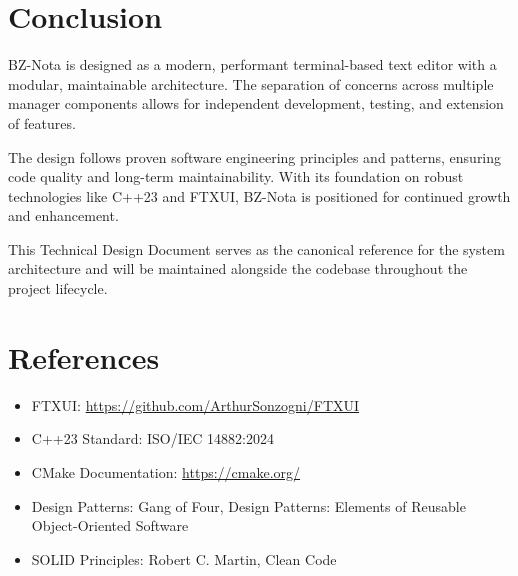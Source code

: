 \documentclass[12pt,a4paper,oneside,openany]{report}
\begin{document}
\chapter*{Conclusion}

BZ-Nota is designed as a modern, performant terminal-based text editor with a modular, maintainable architecture. The separation of concerns across multiple manager components allows for independent development, testing, and extension of features.

The design follows proven software engineering principles and patterns, ensuring code quality and long-term maintainability. With its foundation on robust technologies like C++23 and FTXUI, BZ-Nota is positioned for continued growth and enhancement.

This Technical Design Document serves as the canonical reference for the system architecture and will be maintained alongside the codebase throughout the project lifecycle.

\chapter*{References}

\begin{itemize}
	\item FTXUI: \url{https://github.com/ArthurSonzogni/FTXUI}
	\item C++23 Standard: ISO/IEC 14882:2024
	\item CMake Documentation: \url{https://cmake.org/}
	\item Design Patterns: Gang of Four, Design Patterns: Elements of Reusable Object-Oriented Software
	\item SOLID Principles: Robert C. Martin, Clean Code
\end{itemize}
\end{document}

